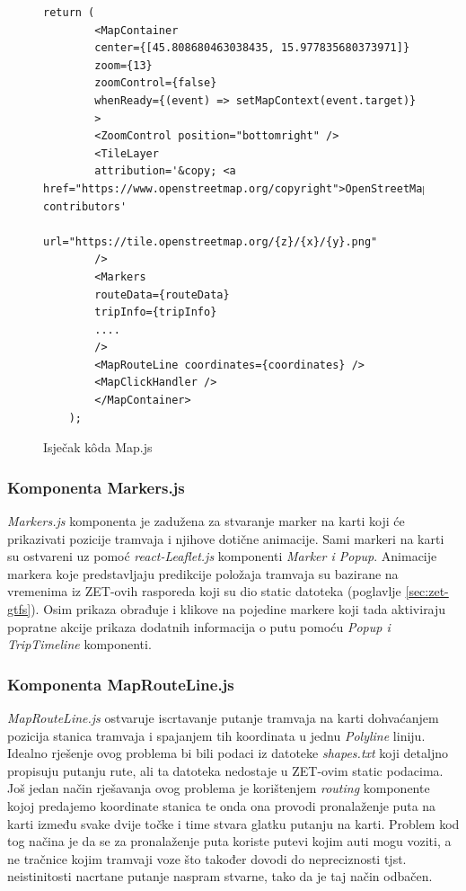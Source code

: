 \documentclass[zavrsnirad]{fer}
\begin{document}
\begin{figure}[H]
	\centering
	\begin{minipage}{0.9\linewidth}
		\begin{lstlisting}[language=JSX]
	return (
		<MapContainer
		center={[45.808680463038435, 15.977835680373971]}
		zoom={13}
		zoomControl={false}
		whenReady={(event) => setMapContext(event.target)}
		>
		<ZoomControl position="bottomright" />
		<TileLayer
		attribution='&copy; <a href="https://www.openstreetmap.org/copyright">OpenStreetMap</a> contributors'
		url="https://tile.openstreetmap.org/{z}/{x}/{y}.png"
		/>
		<Markers
		routeData={routeData}
		tripInfo={tripInfo}
		....
		/>
		<MapRouteLine coordinates={coordinates} />
		<MapClickHandler />
		</MapContainer>
	);
		\end{lstlisting}
	\end{minipage}
	\caption{Isječak k\^oda Map.js}
	\label{slk:mapjs}
\end{figure}

\subsubsection{Komponenta Markers.js}
\textit{Markers.js} komponenta je zadužena za stvaranje marker na karti koji će prikazivati pozicije tramvaja i njihove dotične animacije. Sami markeri na karti su ostvareni uz pomoć \textit{react-\textit{Leaflet.js}} komponenti \textit{Marker i Popup}. Animacije markera koje predstavljaju predikcije položaja tramvaja su bazirane na vremenima iz ZET-ovih rasporeda koji su dio static datoteka (poglavlje \ref{sec:zet-gtfs}). Osim prikaza obrađuje i klikove na pojedine markere koji tada aktiviraju popratne akcije prikaza dodatnih informacija o putu pomoću \textit{Popup i TripTimeline} komponenti.

\subsubsection{Komponenta MapRouteLine.js}
\textit{MapRouteLine.js} ostvaruje iscrtavanje putanje tramvaja na karti dohvaćanjem pozicija stanica tramvaja i spajanjem tih koordinata u jednu \textit{Polyline} liniju. Idealno rješenje ovog problema bi bili podaci iz datoteke \textit{shapes.txt} koji detaljno propisuju putanju rute, ali ta datoteka nedostaje u ZET-ovim static podacima.
Još jedan način rješavanja ovog problema je korištenjem \textit{routing} komponente kojoj predajemo koordinate stanica te onda ona provodi pronalaženje puta na karti između svake dvije točke i time stvara glatku putanju na karti. Problem kod tog načina je da se za pronalaženje puta koriste putevi kojim auti mogu voziti, a ne tračnice kojim tramvaji voze što također dovodi do nepreciznosti tjst. neistinitosti nacrtane putanje naspram stvarne, tako da je taj način odbačen.
\end{document}
